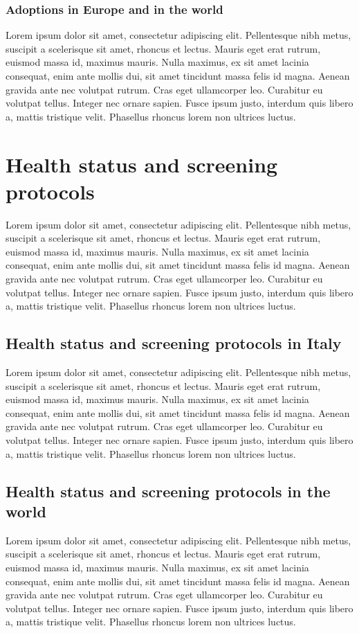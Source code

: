 \subsubsection{Adoptions in Europe and in the world}\label{sub:adoptionsineurope}
Lorem ipsum dolor sit amet, consectetur adipiscing elit. Pellentesque nibh metus, suscipit a scelerisque sit amet, rhoncus et lectus. Mauris eget erat rutrum, euismod massa id, maximus mauris. Nulla maximus, ex sit amet lacinia consequat, enim ante mollis dui, sit amet tincidunt massa felis id magna. Aenean gravida ante nec volutpat rutrum. Cras eget ullamcorper leo. Curabitur eu volutpat tellus. Integer nec ornare sapien. Fusce ipsum justo, interdum quis libero a, mattis tristique velit. Phasellus rhoncus lorem non ultrices luctus.

\section{Health status and screening protocols}\label{sec:screeningprotocols}
Lorem ipsum dolor sit amet, consectetur adipiscing elit. Pellentesque nibh metus, suscipit a scelerisque sit amet, rhoncus et lectus. Mauris eget erat rutrum, euismod massa id, maximus mauris. Nulla maximus, ex sit amet lacinia consequat, enim ante mollis dui, sit amet tincidunt massa felis id magna. Aenean gravida ante nec volutpat rutrum. Cras eget ullamcorper leo. Curabitur eu volutpat tellus. Integer nec ornare sapien. Fusce ipsum justo, interdum quis libero a, mattis tristique velit. Phasellus rhoncus lorem non ultrices luctus.

\subsection{Health status and screening protocols in Italy}\label{sub:healthstatusandscreeningprotocolsinitaly}
Lorem ipsum dolor sit amet, consectetur adipiscing elit. Pellentesque nibh metus, suscipit a scelerisque sit amet, rhoncus et lectus. Mauris eget erat rutrum, euismod massa id, maximus mauris. Nulla maximus, ex sit amet lacinia consequat, enim ante mollis dui, sit amet tincidunt massa felis id magna. Aenean gravida ante nec volutpat rutrum. Cras eget ullamcorper leo. Curabitur eu volutpat tellus. Integer nec ornare sapien. Fusce ipsum justo, interdum quis libero a, mattis tristique velit. Phasellus rhoncus lorem non ultrices luctus.

\subsection{Health status and screening protocols in the world}\label{sub:healthstatusandscreeningprotocolsinworld}
Lorem ipsum dolor sit amet, consectetur adipiscing elit. Pellentesque nibh metus, suscipit a scelerisque sit amet, rhoncus et lectus. Mauris eget erat rutrum, euismod massa id, maximus mauris. Nulla maximus, ex sit amet lacinia consequat, enim ante mollis dui, sit amet tincidunt massa felis id magna. Aenean gravida ante nec volutpat rutrum. Cras eget ullamcorper leo. Curabitur eu volutpat tellus. Integer nec ornare sapien. Fusce ipsum justo, interdum quis libero a, mattis tristique velit. Phasellus rhoncus lorem non ultrices luctus.

